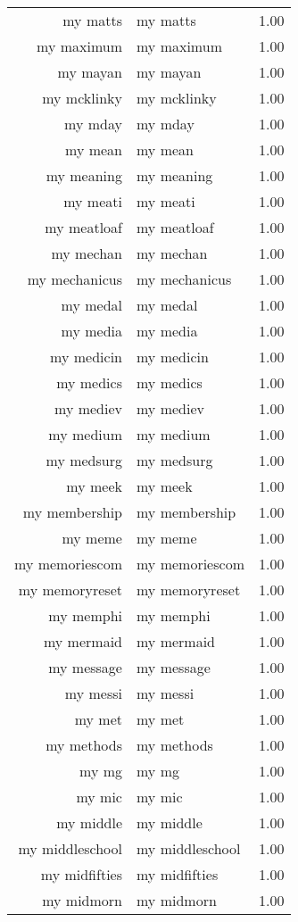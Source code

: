\begin{table}[ht]
\begin{tabular}{rlr}
  my matts & my matts & 1.00 \\ 
  my maximum & my maximum & 1.00 \\ 
  my mayan & my mayan & 1.00 \\ 
  my mcklinky & my mcklinky & 1.00 \\ 
  my mday & my mday & 1.00 \\ 
  my mean & my mean & 1.00 \\ 
  my meaning & my meaning & 1.00 \\ 
  my meati & my meati & 1.00 \\ 
  my meatloaf & my meatloaf & 1.00 \\ 
  my mechan & my mechan & 1.00 \\ 
  my mechanicus & my mechanicus & 1.00 \\ 
  my medal & my medal & 1.00 \\ 
  my media & my media & 1.00 \\ 
  my medicin & my medicin & 1.00 \\ 
  my medics & my medics & 1.00 \\ 
  my mediev & my mediev & 1.00 \\ 
  my medium & my medium & 1.00 \\ 
  my medsurg & my medsurg & 1.00 \\ 
  my meek & my meek & 1.00 \\ 
  my membership & my membership & 1.00 \\ 
  my meme & my meme & 1.00 \\ 
  my memoriescom & my memoriescom & 1.00 \\ 
  my memoryreset & my memoryreset & 1.00 \\ 
  my memphi & my memphi & 1.00 \\ 
  my mermaid & my mermaid & 1.00 \\ 
  my message & my message & 1.00 \\ 
  my messi & my messi & 1.00 \\ 
  my met & my met & 1.00 \\ 
  my methods & my methods & 1.00 \\ 
  my mg & my mg & 1.00 \\ 
  my mic & my mic & 1.00 \\ 
  my middle & my middle & 1.00 \\ 
  my middleschool & my middleschool & 1.00 \\ 
  my midfifties & my midfifties & 1.00 \\ 
  my midmorn & my midmorn & 1.00 \\ 

\end{tabular}
\end{table}
